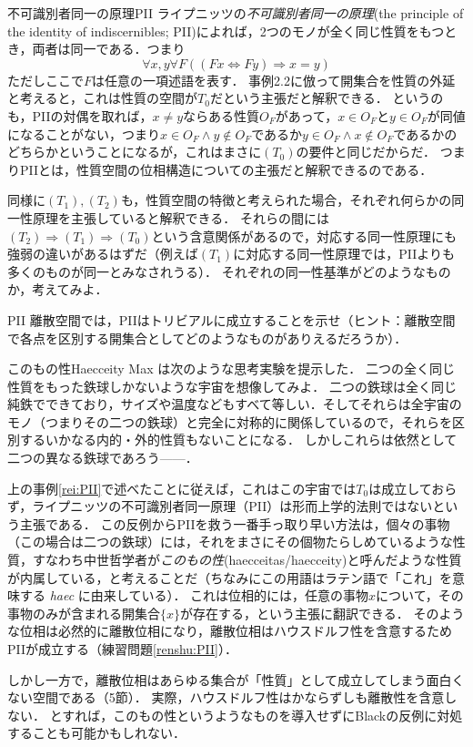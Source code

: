 \documentclass[11pt,a4paper, dvipdfmx]{jsarticle}
\begin{document}
\begin{rei}{不可識別者同一の原理}{PII}
ライプニッツの\emph{不可識別者同一の原理}(the principle of the identity of indiscernibles; PII)によれば，2つのモノが全く同じ性質をもつとき，両者は同一である．つまり
\[
 \forall x, y \forall F ((Fx  \Leftrightarrow Fy) \Rightarrow x=y)
\]
ただしここで$F$は任意の一項述語を表す．
事例2.2に倣って開集合を性質の外延と考えると，これは性質の空間が$T_0$だという主張だと解釈できる．
というのも，PIIの対偶を取れば，$x\neq y$ならある性質$O_F$があって，$x \in O_F$と$y \in O_F$が同値になることがない，つまり$x \in O_F \wedge y \not\in O_F$であるか$y \in O_F \wedge x \not\in O_F$であるかのどちらかということになるが，これはまさに$(T_0)$の要件と同じだからだ．
つまりPIIとは，性質空間の位相構造についての主張だと解釈できるのである\citep{Mormann2020-ly}．
\end{rei}

\begin{renshu}{}{}
同様に$(T_1), (T_2)$も，性質空間の特徴と考えられた場合，それぞれ何らかの同一性原理を主張していると解釈できる．
それらの間には$(T_2) \Rightarrow (T_1) \Rightarrow (T_0)$という含意関係があるので，対応する同一性原理にも強弱の違いがあるはずだ（例えば$(T_1)$に対応する同一性原理では，PIIよりも多くのものが同一とみなされうる）．
それぞれの同一性基準がどのようなものか，考えてみよ．
\end{renshu}

\begin{renshu}{}{PII}
離散空間では，PIIはトリビアルに成立することを示せ（ヒント：離散空間で各点を区別する開集合としてどのようなものがありえるだろうか）．
\end{renshu}

\begin{rei}{このもの性}{Haecceity}
Max \cite{Black1952-dz}は次のような思考実験を提示した．
二つの全く同じ性質をもった鉄球しかないような宇宙を想像してみよ．
二つの鉄球は全く同じ純鉄でできており，サイズや温度などもすべて等しい．そしてそれらは全宇宙のモノ（つまりその二つの鉄球）と完全に対称的に関係しているので，それらを区別するいかなる内的・外的性質もないことになる．
しかしこれらは依然として二つの異なる鉄球であろう------．

上の事例\ref{rei:PII}で述べたことに従えば，これはこの宇宙では$T_0$は成立しておらず，ライプニッツの不可識別者同一原理（PII）は形而上学的法則ではないという主張である．
この反例からPIIを救う一番手っ取り早い方法は，個々の事物（この場合は二つの鉄球）には，それをまさにその個物たらしめているような性質，すなわち中世哲学者が\emph{このもの性}(haecceitas/haecceity)と呼んだような性質が内属している，と考えることだ（ちなみにこの用語はラテン語で「これ」を意味する \emph{haec} に由来している）．
これは位相的には，任意の事物$x$について，その事物のみが含まれる開集合$\{x\}$が存在する，という主張に翻訳できる．
そのような位相は必然的に離散位相になり，離散位相はハウスドルフ性を含意するためPIIが成立する（練習問題\ref{renshu:PII}）．

しかし一方で，離散位相はあらゆる集合が「性質」として成立してしまう面白くない空間である（5節）．
実際，ハウスドルフ性はかならずしも離散性を含意しない．
とすれば，このもの性というようなものを導入せずにBlackの反例に対処することも可能かもしれない．
\end{rei}
\end{document}
